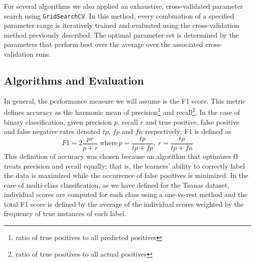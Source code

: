 \documentclass[12pt]{article}
\begin{document}
For several algorithms we also applied an exhaustive, cross-validated parameter search using \texttt{GridSearchCV}. In this method, every combination of a specified parameter range is iteratively trained and evaluated using the cross-validation method previously described. The optimal parameter set is determined by the parameters that perform best over the average over the associated cross-validation runs.

\subsection{Algorithms and Evaluation}
In general, the performance measure we will assume is the F1 score. This metric defines accuracy as the harmonic mean of precision\footnote{ratio of true positives to all predicted positives} and recall\footnote{ratio of true positives to all actual positives}. In the case of binary classification, given precision $p$, recall $r$ and true positive, false positive and false negative rates denoted $tp$, $fp$ and $fn$ respectively; F1 is defined as
\begin{equation}
F1 = 2\frac{pr}{p+r} \ \textrm{where} \ p = \frac{tp}{tp + fp},\ r = \frac{tp}{tp + fn}
\end{equation}
This definition of accuracy was chosen because an algorithm that optimizes f1 treats precision and recall equally; that is, the learners' ability to correctly label the data is maximized while the occurrence of false positives is minimized. In the case of multi-class classification, as we have defined for the Tsanas dataset, individual scores are computed for each class using a one-vs-rest method and the total F1 score is defined by the average of the individual scores weighted by the frequency of true instances of each label.
\end{document}
